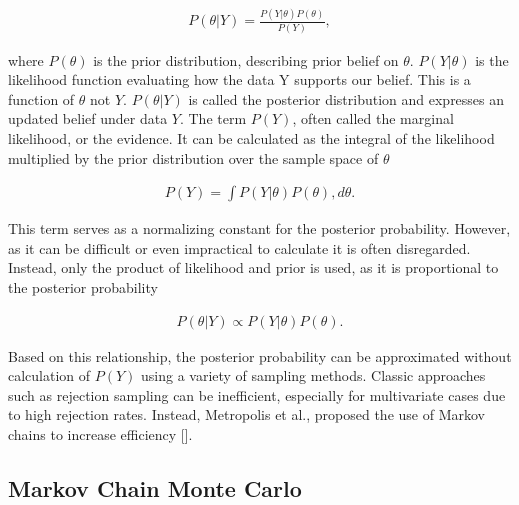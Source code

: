 \begin{equation*}
\begin{split}P(\theta|Y) = \frac{P(Y|\theta)P(\theta)}{P(Y)},\end{split}\end{equation*}


where \(P(\theta)\) is the prior distribution, describing prior belief on \(\theta\). \(P(Y|\theta)\) is the likelihood function evaluating how the data Y supports our belief. This is a function of \(\theta\) not \(Y\). \(P(\theta|Y)\) is called the posterior distribution and expresses an updated belief under data \(Y\). The term \(P(Y)\), often called the marginal likelihood, or the evidence. It can be calculated as the integral of the likelihood multiplied by the prior distribution over the sample space of \(\theta\)



\begin{equation*}
\begin{split}P(Y) = \int{}P(Y|\theta)P(\theta), d\theta{}.\end{split}\end{equation*}


This term serves as a normalizing constant for the posterior probability. However, as it can be difficult or even impractical to calculate it is often disregarded. Instead, only the product of likelihood and prior is used, as it is proportional to the posterior probability



\begin{equation*}
\begin{split}P(\theta|Y) \propto P(Y|\theta)P(\theta).\end{split}\end{equation*}


Based on this relationship, the posterior probability can be approximated without calculation of \(P(Y)\) using a variety of sampling methods. Classic approaches such as rejection sampling can be inefficient, especially for multivariate cases due to high rejection rates. Instead, Metropolis et al., proposed the use of Markov chains to increase efficiency [].



\subsection{Markov Chain Monte Carlo}



